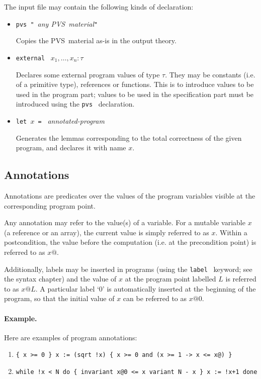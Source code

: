 \documentclass[12pt]{report}
\newcommand{\pvs}{\textsf{PVS}}
\newcommand{\te}[1]{\texttt{#1}~}
\begin{document}
The input file may contain the following kinds of declaration:
\begin{itemize}
  \item \te{pvs "}\textit{any \pvs\ material}\te{"} \par
    Copies the \pvs\ material as-is in the output theory.

  \item \te{external} $x_1,\dots,x_n: \tau$ \par 
    Declares some external program values of type $\tau$.
    They may be constants (i.e. of a primitive type), references 
    or functions. This is to introduce values to be used
    in the program part; values to be used in the specification part
    must be introduced using the \te{pvs} declaration.

  \item \te{let $x$ =} \textit{annotated-program} \par
    Generates the lemmas corresponding to the total correctness of
    the given program, and declares it with name $x$.
\end{itemize}

\subsection{Annotations}

Annotations are predicates over the values of the program variables
visible at the corresponding program point.

Any annotation may refer to the value(s) of a variable.  For a mutable
variable $x$ (a reference or an array), the current value is simply
referred to as $x$. Within a postcondition, the value before the
computation (i.e. at the precondition point) is referred to as $x@$.

Additionally, labels may be inserted in programs (using the 
\te{label} keyword; see the syntax chapter) and the value of $x$ at the
program point labelled $L$ is referred to as $x@L$.
A particular label `0' is automatically inserted at the beginning of the 
program, so that the initial value of $x$ can be referred to as $x@0$.

\paragraph{Example.} Here are examples of program annotations:
\begin{enumerate}
\item
  \verb#{ x >= 0 } x := (sqrt !x) { x >= 0 and (x >= 1 -> x <= x@) }# 
\item
  \verb#while !x < N do { invariant x@0 <= x variant N - x } x := !x+1 done#
\end{enumerate}
\end{document}

